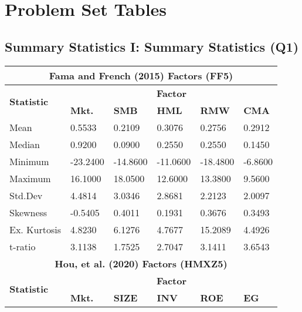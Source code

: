 \documentclass[11pt, english]{article}
\begin{document}
\newpage


\section{Problem Set Tables}

	\subsection{Summary Statistics I: Summary Statistics (Q1)}

\begin{table}[h]
	\scriptsize
	\renewcommand{\arraystretch}{1.25}
\begin{center}
\begin{tabular}{ p{2cm} p{1.5cm} p{1.5cm} p{1.5cm} p{1.5cm} p{1.5cm} }
        \hline
        \hline
        \multicolumn{6}{c}{\textbf{Fama and French (2015) Factors (FF5)}}\\
        \hline
        \hline
        \multirow{2}{*}{\textbf{Statistic}} & \multicolumn{5}{c}{\textbf{Factor}}\\
        \cline{2-6}
        & \textbf{Mkt.} & \textbf{SMB} & \textbf{HML} & \textbf{RMW} & \textbf{CMA}\\
        \hline
	Mean & 0.5533 & 0.2109 & 0.3076 & 0.2756 & 0.2912\\
	Median & 0.9200 & 0.0900 & 0.2550 & 0.2550 & 0.1450\\
	Minimum & -23.2400 & -14.8600 & -11.0600 & -18.4800 & -6.8600\\
	Maximum & 16.1000 & 18.0500 & 12.6000 & 13.3800 & 9.5600\\
	Std.Dev & 4.4814 & 3.0346 & 2.8681 & 2.2123 & 2.0097\\
        Skewness & -0.5405 & 0.4011 & 0.1931 & 0.3676 & 0.3493\\
        Ex. Kurtosis & 4.8230 & 6.1276 & 4.7677 & 15.2089 & 4.4926\\
        t-ratio & 3.1138 & 1.7525 & 2.7047 & 3.1411 & 3.6543\\
        \hline
        \hline
        \multicolumn{6}{c}{\textbf{Hou, et al. (2020) Factors (HMXZ5)}}\\
        \hline
        \hline
        \multirow{2}{*}{\textbf{Statistic}} & \multicolumn{5}{c}{\textbf{Factor}}\\        
        \cline{2-6}
        & \textbf{Mkt.} & \textbf{SIZE} & \textbf{INV} & \textbf{ROE} & \textbf{EG}\\
        \hline

\end{tabular}
\end{center}
\end{table}
\end{document}
